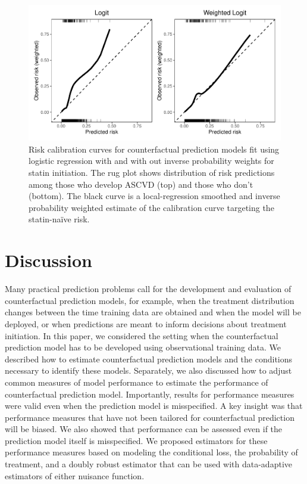 \begin{figure}[p]
    \centering
    \includegraphics{../3_figures/calib.pdf}
    \caption{Risk calibration curves for counterfactual prediction models fit using logistic regression with and with out inverse probability weights for statin initiation. The rug plot shows distribution of risk predictions among those who develop ASCVD (top) and those who don't (bottom). The black curve is a local-regression smoothed and inverse probability weighted estimate of the calibration curve targeting the statin-na\"{i}ve risk.\label{fig:calib}}
\end{figure}




\section{Discussion} \label{sec:discussion}

Many practical prediction problems call for the development and evaluation of counterfactual prediction models, for example, when the treatment distribution changes between the time training data are obtained and when the model will be deployed, or when predictions are meant to inform decisions about treatment initiation. In this paper, we considered the setting when the counterfactual prediction model has to be developed using observational training data. We described how to estimate counterfactual prediction models and the conditions necessary to identify these models. Separately, we also discussed how to adjust common measures of model performance to estimate the performance of counterfactual prediction model. Importantly, results for performance measures were valid even when the prediction model is misspecified. A key insight was that performance measures that have not been tailored for counterfactual prediction will be biased. We also showed that performance can be assessed even if the prediction model itself is misspecified. We proposed estimators for these performance measures based on modeling the conditional loss, the probability of treatment, and a doubly robust estimator that can be used with data-adaptive estimators of either nuisance function. 

